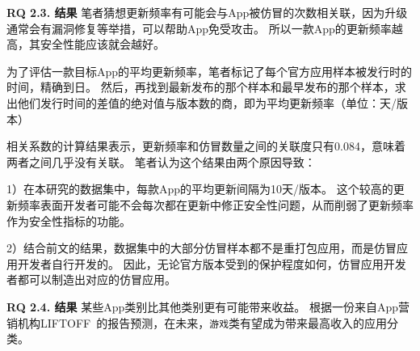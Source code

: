 {\bf RQ 2.3. 结果}
笔者猜想更新频率有可能会与App被仿冒的次数相关联，因为升级通常会有漏洞修复等举措，可以帮助App免受攻击。
所以一款App的更新频率越高，其安全性能应该就会越好。

为了评估一款目标App的平均更新频率，笔者标记了每个官方应用样本被发行时的时间，精确到日。
然后，再找到最新发布的那个样本和最早发布的那个样本，求出他们发行时间的差值的绝对值与版本数的商，即为平均更新频率（单位：天/版本）

相关系数的计算结果表示，更新频率和仿冒数量之间的关联度只有0.084，意味着两者之间几乎没有关联。
笔者认为这个结果由两个原因导致：

1）在本研究的数据集中，每款App的平均更新间隔为10天/版本。
这个较高的更新频率表面开发者可能不会每次都在更新中修正安全性问题，从而削弱了更新频率作为安全性指标的功能。

2）结合前文的结果，数据集中的大部分仿冒样本都不是重打包应用，而是仿冒应用开发者自行开发的。
因此，无论官方版本受到的保护程度如何，仿冒应用开发者都可以制造出对应的仿冒应用。

{\bf RQ 2.4. 结果}
某些App类别比其他类别更有可能带来收益。
根据一份来自App营销机构LIFTOFF~\cite{LIFTOFF_report}的报告预测，在未来，\texttt{游戏}类有望成为带来最高收入的应用分类。

